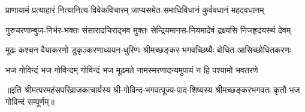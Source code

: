 \begin{large}
\begin{multicols}{2}
\begin{flushleft}
\fourlineindentedshloka
{प्राणायामं प्रत्याहारं}
{नित्यानित्य-विवेकविचारम्}
{जाप्यसमेत-समाधिविधानं}
{कुर्ववधानं महदवधानम्}

\fourlineindentedshloka
{गुरुचरणाम्बुज-निर्भर-भक्तः}
{संसारादचिराद्भव मुक्तः}
{सेन्द्रियमानस-नियमादेवं}
{द्रक्ष्यसि निजहृदयस्थं देवम्}

\fourlineindentedshloka
{मूढः कश्चन वैयाकरणो}
{डुकृञ्करणाध्ययन-धुरिणः}
{श्रीमच्छङ्कर-भगवच्छिष्यैः}
{बोधित आसिच्छोधितकरणः}

\fourlineindentedshloka
{भज गोविन्दं भज गोविन्दम्}
{गोविन्दं भज मूढमते}
{नामस्मरणादन्यमुपायं}
{न हि पश्यामो भवतरणे}

\fourlineshloka{}{}{}{}
\fourlineshloka{}{}{}{}
\end{flushleft}
\end{multicols}
॥इति श्रीमत्परमहंसपरिव्राजकाचार्यस्य श्री-गोविन्द-भगवत्पूज्य-पाद-शिष्यस्य 
श्रीमच्छङ्करभगवतः कृतौ भज गोविन्दं सम्पूर्णम्॥
\end{large}
\setlength{\shlokaspaceskip}{24pt}
\setlength{\columnseprule}{1pt}
\setlength{\columnsep}{30pt}